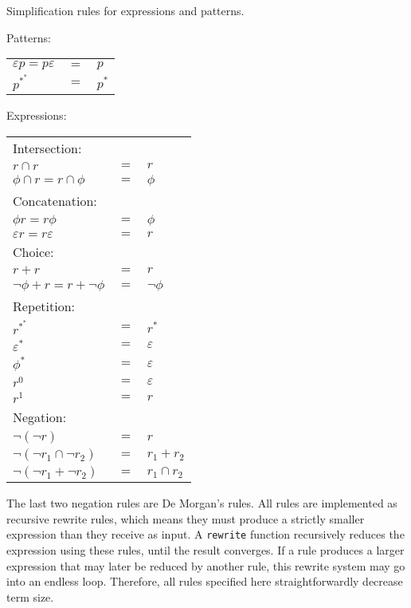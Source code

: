 \begin{defn}[Simplification]
   \label{defn-simplify}
   Simplification rules for expressions and patterns.

   Patterns:

   \begin{tabular}{lrl}
      $\varepsilon p = p \varepsilon$	& $=$	& $p$				\\
      $p^{*^*}$				& $=$	& $p^*$				\\
   \end{tabular}

   Expressions:

   \begin{tabular}{lrl}
      Intersection:								\\
      $r \cap r$			& $=$	& $r$				\\
      $\phi \cap r = r \cap \phi$	& $=$	& $\phi$			\\
      Concatenation:								\\
      $\phi r = r \phi$			& $=$	& $\phi$			\\
      $\varepsilon r = r \varepsilon$	& $=$	& $r$				\\
      Choice:									\\
      $r + r$				& $=$	& $r$				\\
      $\neg\phi + r = r + \neg\phi$	& $=$	& $\neg\phi$			\\
      Repetition:								\\
      $r^{*^*}$				& $=$	& $r^*$				\\
      $\varepsilon^*$			& $=$	& $\varepsilon$			\\
      $\phi^*$				& $=$	& $\varepsilon$			\\
      $r^0$				& $=$	& $\varepsilon$			\\
      $r^1$				& $=$	& $r$				\\
      Negation:									\\
      $\neg(\neg r)$			& $=$	& $r$				\\
      $\neg(\neg r_1 \cap \neg r_2)$	& $=$	& $r_1 + r_2$			\\
      $\neg(\neg r_1 + \neg r_2)$	& $=$	& $r_1 \cap r_2$		\\
   \end{tabular}
\end{defn}

The last two negation rules are De Morgan's rules. All rules are implemented as
recursive rewrite rules, which means they must produce a strictly smaller
expression than they receive as input. A \texttt{rewrite} function recursively
reduces the expression using these rules, until the result converges. If a rule
produces a larger expression that may later be reduced by another rule, this
rewrite system may go into an endless loop. Therefore, all rules specified here
straightforwardly decrease term size.

